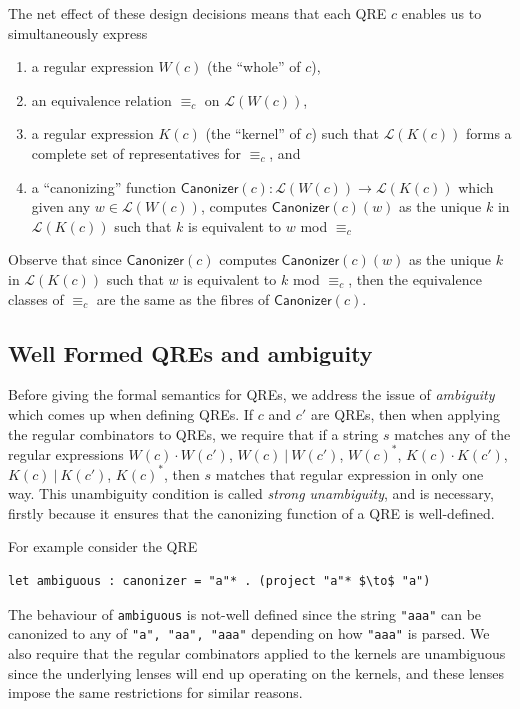 \documentclass{svproc}
\newcommand{\cd}[1]{\lstinline[backgroundcolor=\color{white}]$#1$}
\newcommand{\kw}[1]{\ensuremath{\mathsf{#1}}}
\newcommand{\sep}{\ensuremath{\ | \ }}
\newcommand{\canonizer}{\ensuremath{\kw{Canonizer}}}
\newcommand{\eqrel}[1]{\ensuremath{\equiv_{#1}}}
\begin{document}
The net effect of these design decisions means that each QRE $c$ enables us to
simultaneously express
\begin{enumerate}
  \item a regular expression $W(c)$ (the ``whole'' of $c$),
  \item an equivalence relation $\eqrel{c}$ on $\mathcal{L}(W(c))$,
  \item a regular expression $K(c)$ (the ``kernel'' of $c$)
  such that $\mathcal{L}(K(c))$ forms a complete set of representatives for
  $\eqrel{c}$, and
  \item a ``canonizing'' function $\canonizer(c):\mathcal{L}(W(c))
  \longrightarrow \mathcal{L}(K(c))$ which given any $w \in \mathcal{L}(W(c))$,
  computes $\canonizer(c)(w)$ as the unique $k$ in $\mathcal{L}(K(c))$ such that
  $k$ is equivalent to $w$ mod $\eqrel{c}$
  \end{enumerate}
  Observe that since $\canonizer(c)$ computes $\canonizer(c)(w)$ as the unique
  $k$ in $\mathcal{L}(K(c))$ such that $w$ is equivalent to $k$ mod $\eqrel{c}$,
  then the equivalence classes of $\eqrel{c}$ are the same as the fibres of
  $\canonizer(c)$.

\subsection{Well Formed QREs and ambiguity}
Before giving the formal semantics for QREs, we address the issue of {\em
ambiguity} which comes up when defining QREs. If $c$ and  $c'$ are QREs, then
when applying the regular combinators to QREs, we require that if a string $s$
matches any of the regular expressions $W(c) \cdot W(c')$, $W(c) \sep W(c')$,
$W(c)^*$, $K(c) \cdot K(c')$, $K(c) \sep K(c')$, $K(c)^*$, then $s$ matches
that regular expression in only one way. This unambiguity condition is called
{\em strong unambiguity}, and is necessary, firstly because it ensures that the
canonizing function of a QRE is well-defined.

For example consider the QRE

\begin{lstlisting}
let ambiguous : canonizer = "a"* . (project "a"* $\to$ "a")
\end{lstlisting}

\noindent The behaviour of \cd{ambiguous} is not-well defined since the string
\cd{"aaa"} can be canonized to any of \cd{"a", "aa", "aaa"} depending on how
\cd{"aaa"} is parsed. We also require that the regular combinators applied to
the kernels are unambiguous since the underlying lenses will end up operating
on the kernels, and these lenses impose the same restrictions for similar
reasons.
\end{document}
